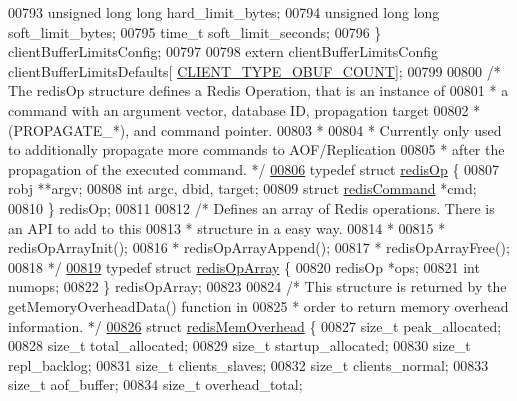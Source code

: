 \begin{DoxyCode}
{{{{{{00793     \textcolor{keywordtype}{unsigned} \textcolor{keywordtype}{long} \textcolor{keywordtype}{long} hard\_limit\_bytes;
00794     \textcolor{keywordtype}{unsigned} \textcolor{keywordtype}{long} \textcolor{keywordtype}{long} soft\_limit\_bytes;
00795     time\_t soft\_limit\_seconds;
00796 \} clientBufferLimitsConfig;
00797 
00798 \textcolor{keyword}{extern} clientBufferLimitsConfig clientBufferLimitsDefaults[
      \hyperlink{server_8h_aea8f6f3fac3a68e35807eba109dbc501}{CLIENT\_TYPE\_OBUF\_COUNT}];
00799 
00800 \textcolor{comment}{/* The redisOp structure defines a Redis Operation, that is an instance of}
00801 \textcolor{comment}{ * a command with an argument vector, database ID, propagation target}
00802 \textcolor{comment}{ * (PROPAGATE\_*), and command pointer.}
00803 \textcolor{comment}{ *}
00804 \textcolor{comment}{ * Currently only used to additionally propagate more commands to AOF/Replication}
00805 \textcolor{comment}{ * after the propagation of the executed command. */}
\hyperlink{structredisOp}{00806} \textcolor{keyword}{typedef} \textcolor{keyword}{struct} \hyperlink{structredisOp}{redisOp} \{
00807     robj **argv;
00808     \textcolor{keywordtype}{int} argc, dbid, target;
00809     \textcolor{keyword}{struct} \hyperlink{structredisCommand}{redisCommand} *cmd;
00810 \} redisOp;
00811 
00812 \textcolor{comment}{/* Defines an array of Redis operations. There is an API to add to this}
00813 \textcolor{comment}{ * structure in a easy way.}
00814 \textcolor{comment}{ *}
00815 \textcolor{comment}{ * redisOpArrayInit();}
00816 \textcolor{comment}{ * redisOpArrayAppend();}
00817 \textcolor{comment}{ * redisOpArrayFree();}
00818 \textcolor{comment}{ */}
\hyperlink{structredisOpArray}{00819} \textcolor{keyword}{typedef} \textcolor{keyword}{struct} \hyperlink{structredisOpArray}{redisOpArray} \{
00820     redisOp *ops;
00821     \textcolor{keywordtype}{int} numops;
00822 \} redisOpArray;
00823 
00824 \textcolor{comment}{/* This structure is returned by the getMemoryOverheadData() function in}
00825 \textcolor{comment}{ * order to return memory overhead information. */}
\hyperlink{structredisMemOverhead}{00826} \textcolor{keyword}{struct} \hyperlink{structredisMemOverhead}{redisMemOverhead} \{
00827     size\_t peak\_allocated;
00828     size\_t total\_allocated;
00829     size\_t startup\_allocated;
00830     size\_t repl\_backlog;
00831     size\_t clients\_slaves;
00832     size\_t clients\_normal;
00833     size\_t aof\_buffer;
00834     size\_t overhead\_total;
}}}}}}
\end{DoxyCode}
